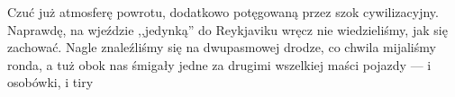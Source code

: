 Czuć już atmosferę powrotu, dodatkowo potęgowaną przez szok cywilizacyjny. Naprawdę, na wjeździe ,,jedynką'' do Reykjaviku wręcz nie wiedzieliśmy, jak się zachować. Nagle znaleźliśmy się na dwupasmowej drodze, co chwila mijaliśmy ronda, a tuż obok nas śmigały jedne za drugimi wszelkiej maści pojazdy --- i osobówki, i tiry\textellipsis


\pagebreak

